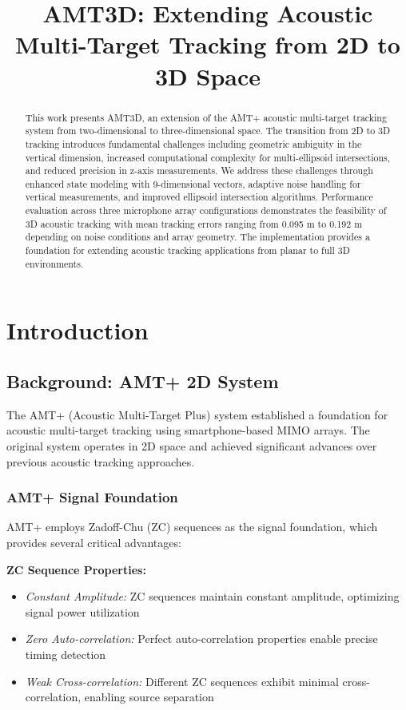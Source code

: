 \documentclass[a4paper]{article}
\title{AMT3D: Extending Acoustic Multi-Target Tracking from 2D to 3D Space}
\begin{document}
\maketitle

\begin{abstract}
{\ninept This work presents AMT3D, an extension of the AMT+ acoustic multi-target tracking system from two-dimensional to three-dimensional space. The transition from 2D to 3D tracking introduces fundamental challenges including geometric ambiguity in the vertical dimension, increased computational complexity for multi-ellipsoid intersections, and reduced precision in z-axis measurements. We address these challenges through enhanced state modeling with 9-dimensional vectors, adaptive noise handling for vertical measurements, and improved ellipsoid intersection algorithms. Performance evaluation across three microphone array configurations demonstrates the feasibility of 3D acoustic tracking with mean tracking errors ranging from 0.095 m to 0.192 m depending on noise conditions and array geometry. The implementation provides a foundation for extending acoustic tracking applications from planar to full 3D environments.}
\end{abstract}

\section{Introduction}

\subsection{Background: AMT+ 2D System}

The AMT+ (Acoustic Multi-Target Plus) system \cite{amt_plus} established a foundation for acoustic multi-target tracking using smartphone-based MIMO arrays. The original system operates in 2D space and achieved significant advances over previous acoustic tracking approaches.

\subsubsection{AMT+ Signal Foundation}

AMT+ employs Zadoff-Chu (ZC) sequences as the signal foundation, which provides several critical advantages:

{\bf ZC Sequence Properties:}
\begin{itemize}
\item {\em Constant Amplitude:} ZC sequences maintain constant amplitude, optimizing signal power utilization
\item {\em Zero Auto-correlation:} Perfect auto-correlation properties enable precise timing detection
\item {\em Weak Cross-correlation:} Different ZC sequences exhibit minimal cross-correlation, enabling source separation
\end{itemize}
\end{document}
